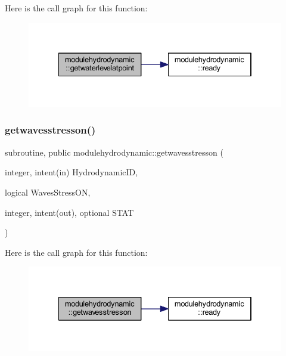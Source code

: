 Here is the call graph for this function\+:\nopagebreak
\begin{figure}[H]
\begin{center}
\leavevmode
\includegraphics[width=334pt]{namespacemodulehydrodynamic_aed5f042412115b2fc0605a45374090fc_cgraph}
\end{center}
\end{figure}
\mbox{\label{namespacemodulehydrodynamic_a40c227e3eb106f2eae640e8533ab5e3b}} 
\subsubsection{\texorpdfstring{getwavesstresson()}{getwavesstresson()}}
{\footnotesize\ttfamily subroutine, public modulehydrodynamic\+::getwavesstresson (\begin{DoxyParamCaption}\item[{integer, intent(in)}]{Hydrodynamic\+ID,  }\item[{logical}]{Waves\+Stress\+ON,  }\item[{integer, intent(out), optional}]{S\+T\+AT }\end{DoxyParamCaption})}

Here is the call graph for this function\+:\nopagebreak
\begin{figure}[H]
\begin{center}
\leavevmode
\includegraphics[width=334pt]{namespacemodulehydrodynamic_a40c227e3eb106f2eae640e8533ab5e3b_cgraph}
\end{center}
\end{figure}
\mbox{\label{namespacemodulehydrodynamic_af349d31454a6c7a674ed8d54430b0e52}} 
